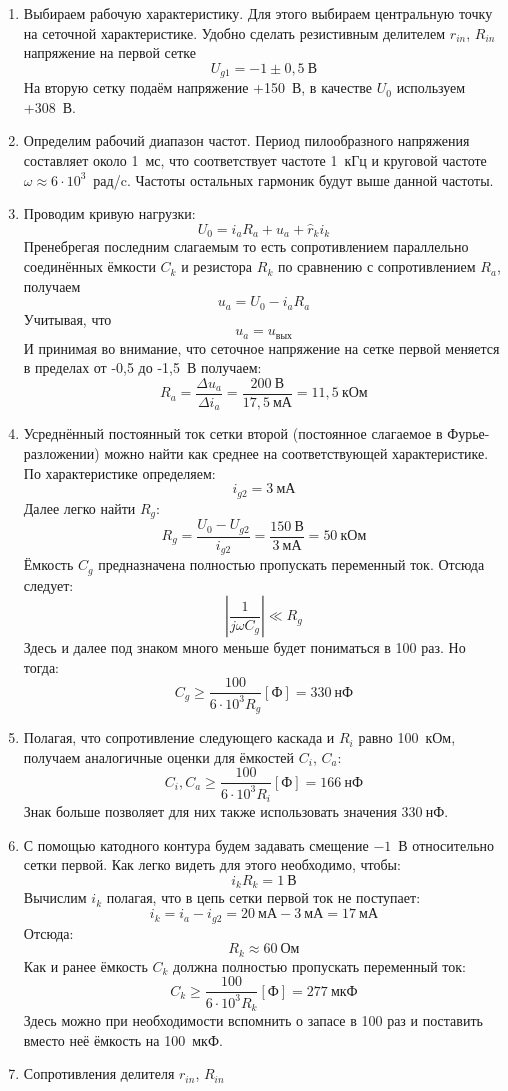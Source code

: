 \documentclass[a4paper,14pt]{extarticle}
\begin{document}
	\begin{enumerate}
		\item Выбираем рабочую характеристику. Для этого выбираем центральную точку на сеточной характеристике. Удобно сделать резистивным делителем $r_{in}$, $R_{in}$ напряжение на первой сетке
		\[
			U_{g1} = - 1 \pm 0{,}5~\text{В}
		\]
		На вторую сетку подаём напряжение +150~В, в качестве $U_0$ используем +308~В.
		\item Определим рабочий диапазон частот. Период пилообразного напряжения составляет около 1~мс, что соответствует частоте 1~кГц и круговой частоте $\omega \approx 6\cdot10^3$~рад/c. Частоты остальных гармоник будут выше данной частоты. 
		\item Проводим кривую нагрузки:
		\[
			U_0 = i_a R_a + u_a + \hat{r}_k i_k
		\]
		Пренебрегая последним слагаемым то есть сопротивлением параллельно соединённых ёмкости $C_k$ и резистора $R_k$ по сравнению с сопротивлением $R_a$, получаем
		\[
			u_a = U_0 - i_a R_a
		\]
		Учитывая, что
		\[
			u_a = u_{\text{вых}}
		\]
		И принимая во внимание, что сеточное напряжение на сетке первой меняется в пределах от -0,5 до -1,5~В получаем:
		\[
			R_a = \frac{\Delta u_a}{\Delta i_a} = \frac{200~\text{В}}{17{,}5~\text{мА}} = 11{,}5~\text{кОм}
		\]
		\item Усреднённый постоянный ток сетки второй (постоянное слагаемое в Фурье-разложении) можно найти как среднее на соответствующей характеристике. По характеристике определяем:
		\[
			i_{g2} = 3~\text{мА}
		\]
		Далее легко найти $R_g$:
		\[
			R_g = \frac{U_0 - U_{g2}}{i_{g2}} = \frac{150~\text{В}}{3~\text{мА}} = 50~\text{кОм}
		\]
		Ёмкость $C_g$ предназначена полностью пропускать переменный ток. Отсюда следует:
		\[
			\left|\frac{1}{j\omega C_g}\right| \ll R_g
		\]
		Здесь и далее под знаком много меньше будет пониматься в 100 раз. Но тогда:
		\[
			C_g \geq \frac{100}{6\cdot10^3 R_g} [\text{Ф}] = 330~\text{нФ} 
		\]
		\item Полагая, что сопротивление следующего каскада и $R_i$ равно 100~кОм, получаем аналогичные оценки для ёмкостей $C_i$, $C_a$:
		\[
			C_i, C_a \geq \frac{100}{6\cdot10^3 R_i} [\text{Ф}] = 166~\text{нФ}
		\]
		Знак больше позволяет для них также использовать значения $330~\text{нФ}$.
		\item С помощью катодного контура будем задавать смещение $-1$~В относительно сетки первой. Как легко видеть для этого необходимо, чтобы:
		\[
			i_k R_k = 1~\text{В} 
		\]
		Вычислим $i_k$ полагая, что в цепь сетки первой ток не поступает:
		\[
			i_k = i_a - i_{g2} = 20~\text{мА} - 3~\text{мА} = 17~\text{мА}
		\]
		Отсюда:
		\[
			R_k \approx 60~\text{Ом}
		\]
		Как и ранее ёмкость $C_k$ должна полностью пропускать переменный ток:
		\[
			C_k \geq \frac{100}{6\cdot10^3 R_k} [\text{Ф}] = 277~\text{мкФ}
		\]
		Здесь можно при необходимости вспомнить о запасе в 100 раз и поставить вместо неё ёмкость на 100~мкФ.
		\item
		Сопротивления делителя $r_{in}$, $R_{in}$
	\end{enumerate}
\end{document}
